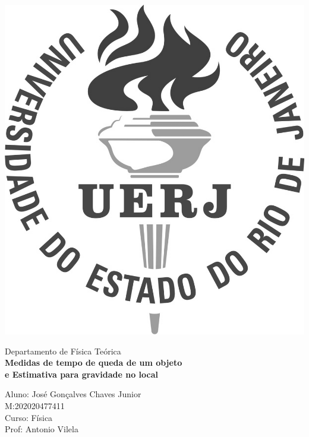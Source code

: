 \documentclass[11pt, letterpaper]{article}
\begin{document}
\begin{titlepage}
\thispagestyle{empty}
\parbox{1.5cm}{\includegraphics[scale=0.25]{logo_uerj_cinza.png}}
\Large{Departamento de Física Teórica} \\

\vspace{5cm}
\hspace{3.0cm} \Large{\textbf{Medidas de tempo de queda de um objeto\\}}
\hspace*{4.5cm} \Large{\textbf{e Estimativa para gravidade no local\\}}
\vspace{8cm}

\begin{flushright}
Aluno: José Gonçalves Chaves Junior \\
M:202020477411\\
Curso: Física \\
Prof: Antonio Vilela
\end{flushright}

\end{titlepage}
\tableofcontents
\end{document}
